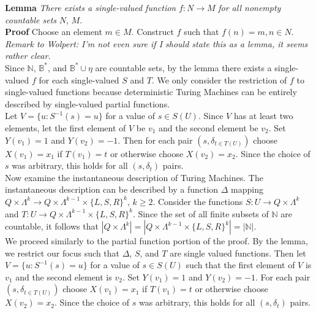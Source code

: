 \documentclass[11pt]{article}
\newcommand{\N}{\mathbb{N}}
\newcommand{\B}{\mathbb{B}}
\begin{document}
\textbf{Lemma} \: \textit{There exists a single-valued function} $ f: N \rightarrow M $ \textit{for all nonempty countable sets} $N$, $M$. \\
\textbf {Proof} \: Choose an element $ m \in  M $. Construct $ f $ such that $ f(n) = m, n \in N $. \textit{Remark to Wolpert: I'm not even sure if I should state this as a lemma, it seems rather clear.} \\


Since $ \N $, $ \B^{*} $, and $ \B^{*} \cup \eta $ are countable sets, by the lemma there exists a single-valued $ f $ for each single-valued $ S $ and $ T $. We only consider the restriction of $ f $ to single-valued functions because deterministic Turing Machines can be entirely described by single-valued partial functions. \\

Let $ V = \{u : S^{-1}(s) = u \} $ for a value of $ s \in S(U) $. Since $ V $ has at least two elements, let the first element of $ V $ be $ v_1 $ and the second element be $ v_2 $. Set $ Y(v_{1}) = 1 $ and $ Y(v_{2}) = -1 $. Then for each pair $ (s, \delta_{t \in T(U)} ) $ choose $ X(v_{1}) = x_1 $ if $ T(v_1) = t $ or otherwise choose $ X(v_2) = x_2 $. Since the choice of $ s $ was arbitrary, this holds for all $ (s, \delta_t) $ pairs. \\



Now examine the instantaneous description of Turing Machines. The instantaneous description can be described by a function $ \Delta $ mapping $ Q \times \Lambda^{k} \rightarrow Q \times \Lambda^{k - 1} \times \{ L, S, R \} ^{k} $, $ k \geq 2 $. Consider the functions $ S: U \rightarrow Q \times \Lambda^{k} $ and $ T: U \rightarrow Q \times \Lambda^{k - 1} \times \{ L, S, R \}^ {k} $. Since the set of all finite subsets of $ \N $ are countable, it follows that $ | Q \times \Lambda^{k} | = | Q \times \Lambda^{k - 1} \times \{ L, S, R \} ^{k} | = | \N | $. \\

We proceed similarly to the partial function portion of the proof. By the lemma, we restrict our focus such that $ \Delta $, $ S $, and $ T $ are single valued functions. Then let $ V = \{u : S^{-1}(s) = u \} $ for a value of $ s \in S(U) $ such that  the first element of $ V $ is $ v_1 $ and the second element is $ v_2 $. Set $ Y(v_{1}) = 1 $ and $ Y(v_{2}) = -1 $. For each pair $ (s, \delta_{t \in T(U)} ) $ choose $ X(v_{1}) = x_1 $ if $ T(v_1) = t $ or otherwise choose $ X(v_2) = x_2 $. Since the choice of $ s $ was arbitrary, this holds for all $ (s, \delta_t) $ pairs. \\
\end{document}
